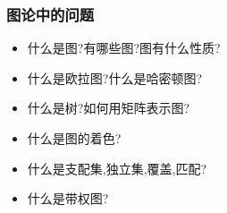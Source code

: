 {{  \subsubsection{图论中的问题}{
    \begin{itemize}
      \item 什么是图?有哪些图?图有什么性质?
      \item 什么是欧拉图?什么是哈密顿图?
      \item 什么是树?如何用矩阵表示图?
      \item 什么是图的着色?
      \item 什么是支配集,独立集,覆盖,匹配?
      \item 什么是带权图?
    \end{itemize}
  }%

}%

}%